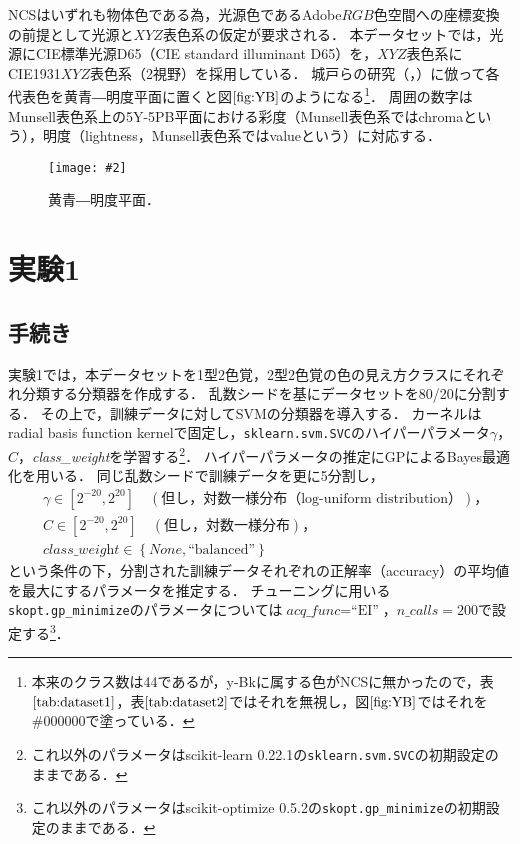 \documentclass[uplatex,paper=a4,fontsize=4.0truemm,jafontsize=4.0truemm,head_space=30.0truemm,foot_space=30.0truemm,baselineskip=8.0truemm,line_length=40zw,gutter=25.0truemm,oneside,openany,fleqn,hanging_panctuation,open_bracket_pos=nibu_tentsuki,dvipdfmx,jis2004,book,titlepage]{jlreq}
\theoremstyle{mystyle}
\newcommand{\captiondot}[1]{\caption{#1．}}
\newcommand{\figureinput}[4]{\begin{figure}[tbp]\centering\texttt{[image: \#2]}\captiondot{#3}\label{fig:#4}\end{figure}}
\newcommand{\mathdisplaystyle}[1]{\(\displaystyle{#1}\)}
\newcommand{\Reference}[1]{\mathdisplaystyle{\ref{#1}}}
\newcommand{\negativevalue}[1]{{-#1}}
\newcommand{\parentheses}[1]{\left(#1\right)}
\newcommand{\braces}[1]{\left\{#1\right\}}
\newcommand{\squarebrackets}[1]{\left[#1\right]}
\begin{document}
			NCSはいずれも物体色である為，光源色であるAdobe\mathdisplaystyle{RGB}色空間への座標変換の前提として光源と\mathdisplaystyle{XYZ}表色系の仮定が要求される．
			本データセットでは，光源にCIE標準光源D65（CIE standard illuminant D65）を，\mathdisplaystyle{XYZ}表色系にCIE1931\mathdisplaystyle{XYZ}表色系（2\textdegree 視野）\cite[pp.~28--30]{Yaguchi2017a}を採用している．
			城戸らの研究（\cite[図1]{Kido2017}，\cite[図1]{Kido2018}）に倣って各代表色を黄青―明度平面に置くと図\Reference{fig:YB}のようになる\footnote{本来のクラス数は44であるが，y-Bkに属する色がNCSに無かったので，表\Reference{tab:dataset1}，表\Reference{tab:dataset2}ではそれを無視し，図\Reference{fig:YB}ではそれを\#000000で塗っている．}．
			周囲の数字はMunsell表色系上の5Y-5PB平面における彩度（Munsell表色系ではchromaという），明度（lightness，Munsell表色系ではvalueという）に対応する．
			\figureinput{width=\linewidth}{D:/a/figs/YB.png}{黄青―明度平面}{YB}
		\section{実験1}
			\subsection{手続き}
				実験1では，本データセットを1型2色覚，2型2色覚の色の見え方クラスにそれぞれ分類する分類器を作成する．
				乱数シードを基にデータセットを80/20に分割する．
				その上で，訓練データに対してSVMの分類器を導入する．
				カーネルはradial basis function kernelで固定し，\texttt{sklearn{.}svm{.}SVC}のハイパーパラメータ\mathdisplaystyle{\gamma}，\mathdisplaystyle{C}，\textit{class\_weight}を学習する\footnote{これ以外のパラメータはscikit-learn 0.22.1の\texttt{sklearn{.}svm{.}SVC}の初期設定のままである．}．
				ハイパーパラメータの推定にGPによるBayes最適化を用いる．
				同じ乱数シードで訓練データを更に5分割し，
				\begin{align}
					&\gamma\in\squarebrackets{2^\negativevalue{20},2^{20}}\quad\parentheses{\textrm{但し，対数一様分布（log-uniform distribution）}}\textrm{，}\label{eq:gamma}\\
					&C\in\squarebrackets{2^\negativevalue{20},2^{20}}\quad\parentheses{\textrm{但し，対数一様分布}}\textrm{，}\label{eq:C}\\
					&\textit{class\_weight}\in\braces{\textit{None},\textrm{``balanced''}}\label{eq:classweight}
				\end{align}
				という条件の下，分割された訓練データそれぞれの正解率（accuracy）の平均値を最大にするパラメータを推定する．
				チューニングに用いる\texttt{skopt{.}gp\_minimize}のパラメータについては\mathdisplaystyle{\textit{acq\_func}=\textrm{``EI''}}，\mathdisplaystyle{\textit{n\_calls}=200}で設定する\footnote{これ以外のパラメータはscikit-optimize 0.5.2の\texttt{\texttt{skopt{.}gp\_minimize}}の初期設定のままである．}．
\end{document}
